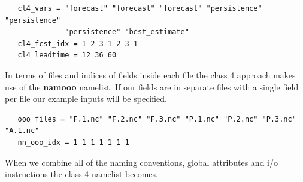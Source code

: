 \begin{alltt}
\tiny
\begin{verbatim}
   cl4_vars = "forecast" "forecast" "forecast" "persistence" "persistence"
              "persistence" "best_estimate"
   cl4_fcst_idx = 1 2 3 1 2 3 1
   cl4_leadtime = 12 36 60 
\end{verbatim}
\end{alltt}

In terms of files and indices of fields inside each file the class 4 approach
makes use of the \textbf{namooo} namelist. If our fields are in separate files
with a single field per file our example inputs will be specified.

\begin{alltt}
\tiny
\begin{verbatim}
   ooo_files = "F.1.nc" "F.2.nc" "F.3.nc" "P.1.nc" "P.2.nc" "P.3.nc" "A.1.nc"
   nn_ooo_idx = 1 1 1 1 1 1 1
\end{verbatim}
\end{alltt}

When we combine all of the naming conventions, global attributes and i/o instructions
the class 4 namelist becomes.

